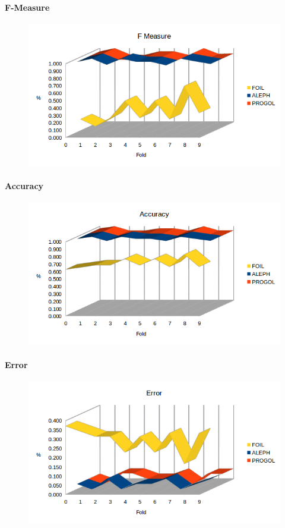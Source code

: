 \paragraph{F-Measure}
\begin{figure}[hbtp]
	\includegraphics[width=1.2\textwidth]{img/datasetGraph/mlj/nodiscr/fm.png}
	\label{mljnodiscr-F-measure}
\end{figure}
\paragraph{Accuracy}
\begin{figure}[hbtp]
	\includegraphics[width=1.2\textwidth]{img/datasetGraph/mlj/nodiscr/accuracy.png}
	\label{mljnodiscr-Accuracy}
\end{figure}
\paragraph{Error}
\begin{figure}[hbtp]
	\includegraphics[width=1.2\textwidth]{img/datasetGraph/mlj/nodiscr/error.png}
	\label{mljnodiscr-Error}
\end{figure}